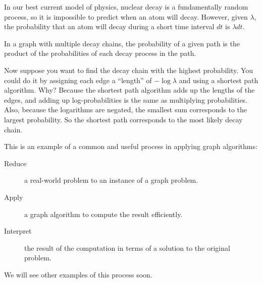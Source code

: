 \documentclass[10pt]{book}
\begin{document}
In our best current model of physics, nuclear decay is a fundamentally
random process, so it is impossible to predict when an atom will
decay.  However, given $\lambda$, the probability that an atom will
decay during a short time interval $dt$ is $\lambda dt$.

In a graph with multiple decay chains, the probability of a
given path is the product of the probabilities of each decay
process in the path.

Now suppose you want to find the decay chain with the highest
probability.  You could do it by assigning each edge a ``length'' of
$-\log \lambda$ and using a shortest path algorithm.  Why?  Because the
shortest path algorithm adds up the lengths of the edges, and adding
up log-probabilities is the same as multiplying probabilities.  Also,
because the logarithms are negated, the smallest sum corresponds to
the largest probability.  So the shortest path corresponds to the most
likely decay chain.

This is an example of a common and useful process in applying
graph algorithms:

\begin{description}

\item[Reduce] a real-world problem to an instance of a graph
problem.
 
\item[Apply] a graph algorithm to compute the result efficiently.

\item[Interpret] the result of the computation in terms of a
solution to the original problem.

\end{description}

We will see other examples of this process soon.
\end{document}
